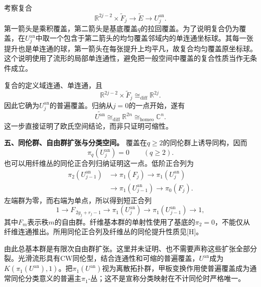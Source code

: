 考察复合
\[
\mathbb R^{2j-2}\times\widetilde F_j
\longrightarrow\widetilde E\longrightarrow U_j^{\mathrm{an}}.
\]
第一箭头是乘积覆盖，第二箭头是基底覆盖$q$的拉回覆盖。为了说明复合仍为覆盖，在$U_j^{\mathrm{an}}$中取一个包含于第二箭头的均匀覆盖邻域内的单连通坐标球。其每一张提升也是单连通的球，第一箭头在每张提升上均平凡，故复合均匀覆盖原坐标球。这个说明使用了流形的局部单连通性，避免把一般空间中覆盖的复合性质当作无条件成立。

复合的定义域连通、单连通，且
\[
\mathbb R^{2j-2}\times\widetilde F_j
\cong_{\mathrm{diff}}\mathbb R^{2j}.
\]
因此它确为$U_j^{\mathrm{an}}$的普遍覆盖。归纳从$j=0$的一点开始，遂有
\[
\widetilde{U^{\mathrm{an}}}
\cong_{\mathrm{diff}}\mathbb R^{2n}
\cong_{\mathrm{homeo}}\mathbb C^n.
\]
这一步直接证明了欧氏空间结论，而非只证明可缩性。

\par\medskip\noindent\textbf{五、同伦群、自由群扩张与分类空间。}
覆盖在$q\geq2$的同伦群上诱导同构，因而
\[
\pi_q(U_j^{\mathrm{an}})=0\qquad(q\geq2).
\]
也可以用纤维丛的同伦正合列归纳证明这一点。低阶正合列为
\[
\begin{split}
\pi_2(U_{j-1}^{\mathrm{an}})
&\longrightarrow\pi_1(F_j)
\longrightarrow\pi_1(U_j^{\mathrm{an}})\\
&\longrightarrow\pi_1(U_{j-1}^{\mathrm{an}})
\longrightarrow\pi_0(F_j).
\end{split}
\]
左端群为零，而右端为单点，所以得到短正合列
\[
1\longrightarrow F_{\,2g_j+r_j-1}
\longrightarrow\pi_1(U_j^{\mathrm{an}})
\longrightarrow\pi_1(U_{j-1}^{\mathrm{an}})
\longrightarrow1,
\]
其中$F_m$表示秩$m$的自由群。纤维基本群的单射性使用了基底的$\pi_2=0$，不能仅从纤维连通推出。所用同伦正合列及纤维丛的同伦提升性质见[H]。

由此总基本群是有限次自由群扩张。这里并未证明、也不需要声称这些扩张全部分裂。光滑流形具有CW同伦型，结合连通性和可缩的普遍覆盖，$U^{\mathrm{an}}$成为
$K(\pi_1(U^{\mathrm{an}}),1)$。把$\pi_1(U^{\mathrm{an}})$视为离散拓扑群，甲板变换作用使普遍覆盖成为通常同伦分类意义的普遍主$\pi_1$-丛；这不是宣称分类映射在不计同伦时严格唯一。

